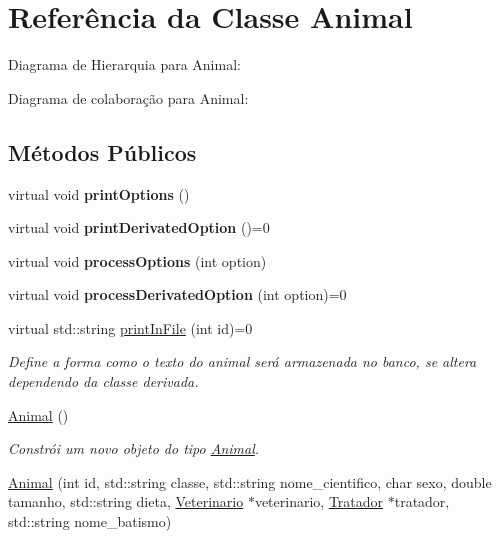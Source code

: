 \hypertarget{classAnimal}{}\section{Referência da Classe Animal}
\label{classAnimal}


Diagrama de Hierarquia para Animal\+:


Diagrama de colaboração para Animal\+:
\subsection*{Métodos Públicos}
\begin{DoxyCompactItemize}
\item 
\mbox{\label{classAnimal_ae1ee2e08e23f2cbd308300b80ba5c71c}} 
virtual void {\bfseries print\+Options} ()
\item 
\mbox{\label{classAnimal_a5083d76d5f9ffa1b5fbc91141d0a1cdf}} 
virtual void {\bfseries print\+Derivated\+Option} ()=0
\item 
\mbox{\label{classAnimal_a3deb0e420f30f6cd49ac7568b1bdba71}} 
virtual void {\bfseries process\+Options} (int option)
\item 
\mbox{\label{classAnimal_abcf701446f3dd43630d3558a0c3d79a3}} 
virtual void {\bfseries process\+Derivated\+Option} (int option)=0
\item 
virtual std\+::string \hyperlink{classAnimal_ac75406040726a6339932d70164cc7242}{print\+In\+File} (int id)=0
\begin{DoxyCompactList}\small\item\em Define a forma como o texto do animal será armazenada no banco, se altera dependendo da classe derivada. \end{DoxyCompactList}\item 
\mbox{\label{classAnimal_a1e726a49ec952443190ac62dad22353c}} 
\hyperlink{classAnimal_a1e726a49ec952443190ac62dad22353c}{Animal} ()
\begin{DoxyCompactList}\small\item\em Constrói um novo objeto do tipo \hyperlink{classAnimal}{Animal}. \end{DoxyCompactList}\item 
\hyperlink{classAnimal_ab045099aad905de0d8c7fbbab296cad6}{Animal} (int id, std\+::string classe, std\+::string nome\+\_\+cientifico, char sexo, double tamanho, std\+::string dieta, \hyperlink{classVeterinario}{Veterinario} $\ast$veterinario, \hyperlink{classTratador}{Tratador} $\ast$tratador, std\+::string nome\+\_\+batismo)

\end{DoxyCompactItemize}
